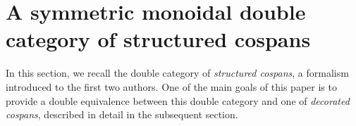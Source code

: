 \documentclass{amsart}
\begin{document}
\begin{comment}
\subsection*{Acknowledgements}
Daniel Cicala, person that Christina emailed about lax slice category? {\chris did you use it after all?} No, I did not.
\end{comment}




\section{A symmetric monoidal double category of structured cospans}\label{sec:structuredcospans}

In this section, we recall the double category of \emph{structured cospans}, a formalism introduced to the first two authors. One of the main goals of this paper is to provide a double equivalence between this double category and one of \emph{decorated cospans}, described in detail in the subsequent section.
\end{document}
